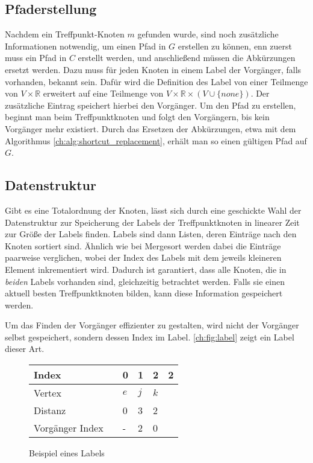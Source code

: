 \subsection{Pfaderstellung}

Nachdem ein Treffpunkt-Knoten $m$ gefunden wurde, sind noch zusätzliche Informationen notwendig, um einen Pfad in $G$ erstellen zu können, enn zuerst muss ein Pfad in $C$ erstellt werden, und anschließend müssen die Abkürzungen ersetzt werden.
Dazu muss für jeden Knoten in einem Label der Vorgänger, falls vorhanden, bekannt sein.
Dafür wird die Definition des Label von einer Teilmenge von $V \times \mathbb{R}$ erweitert auf eine Teilmenge von $V \times \mathbb{R} \times (V \cup \{ none \}) $.
Der zusätzliche Eintrag speichert hierbei den Vorgänger.
Um den Pfad zu erstellen, beginnt man beim Treffpunktknoten und folgt den Vorgängern, bis kein Vorgänger mehr existiert.
Durch das Ersetzen der Abkürzungen, etwa mit dem Algorithmus \ref{ch:alg:shortcut_replacement}, erhält man so einen gültigen Pfad auf $G$.

\subsection{Datenstruktur}

Gibt es eine Totalordnung der Knoten, lässt sich durch eine geschickte Wahl der Datenstruktur zur Speicherung der Labels der Treffpunktknoten in linearer Zeit zur Größe der Labels finden.
Labels sind dann Listen, deren Einträge nach den Knoten sortiert sind.
Ähnlich wie bei Mergesort werden dabei die Einträge paarweise verglichen, wobei der Index des Labels mit dem jeweils kleineren Element inkrementiert wird.
Dadurch ist garantiert, dass alle Knoten, die in \emph{beiden} Labels vorhanden sind, gleichzeitig betrachtet werden.
Falls sie einen aktuell besten Treffpunktknoten bilden, kann diese Information gespeichert werden.

Um das Finden der Vorgänger effizienter zu gestalten, wird nicht der Vorgänger selbst gespeichert, sondern dessen Index im Label.
\autoref{ch:fig:label} zeigt ein Label dieser Art.

\begin{figure}[ht]
  \centering
  \begin{tabular}{@{}llllll@{}}
    \toprule
    Index           &  & 0   & 1   & 2   & 2 \\ \midrule
    Vertex          &  & $e$ & $j$ & $k$ &   \\
    Distanz         &  & 0   & 3   & 2   &   \\
    Vorgänger Index &  & -   & 2   & 0   &   \\ \bottomrule
  \end{tabular}
  \caption{Beispiel eines Labels}
  \label{ch:fig:label}
\end{figure}

